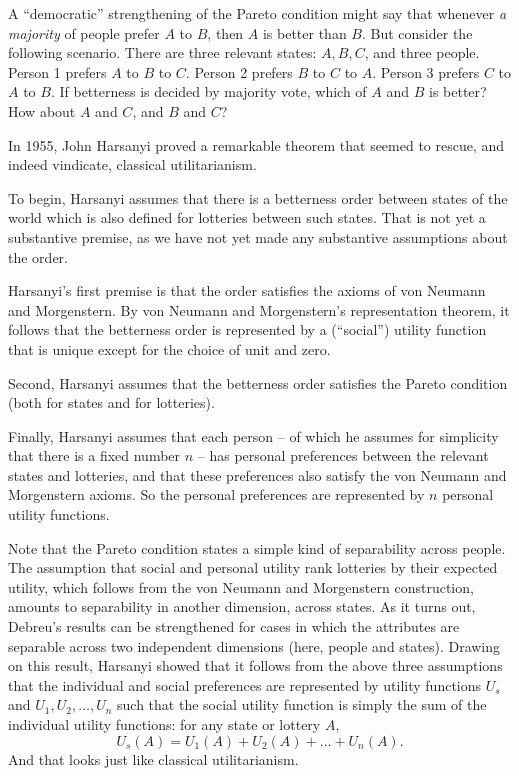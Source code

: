 \begin{exercise1}
  A ``democratic'' strengthening of the Pareto condition might say that whenever
  \emph{a majority} of people prefer $A$ to $B$, then $A$ is better than $B$.
  But consider the following scenario. There are three relevant states: $A,B,C$,
  and three people. Person 1 prefers $A$ to $B$ to $C$. Person 2 prefers $B$ to
  $C$ to $A$. Person 3 prefers $C$ to $A$ to $B$. If betterness is decided by
  majority vote, which of $A$ and $B$ is better? How about $A$ and $C$, and $B$
  and $C$?
\end{exercise1}

In 1955, John Harsanyi proved a remarkable theorem that seemed to
rescue, and indeed vindicate, classical utilitarianism. 

To begin, Harsanyi assumes that there is a betterness order
between states of the world which is also defined for lotteries between
such states. That is not yet a substantive premise, as we have not yet
made any substantive assumptions about the order. 

Harsanyi's first premise is that the order satisfies the axioms of von
Neumann and Morgenstern. By von Neumann and Morgenstern's
representation theorem, it follows that the betterness order is
represented by a (``social'') utility function that is unique except
for the choice of unit and zero.

Second, Harsanyi assumes that the betterness order satisfies the
Pareto condition (both for states and for lotteries).

Finally, Harsanyi assumes that each person -- of which he assumes for simplicity
that there is a fixed number $n$ -- has personal preferences between the
relevant states and lotteries, and that these preferences also satisfy the von
Neumann and Morgenstern axioms. So the personal preferences  are represented
by $n$ personal utility functions.

Note that the Pareto condition states a simple kind of separability
across people. The assumption that social and personal utility rank
lotteries by their expected utility, which follows from the von
Neumann and Morgenstern construction, amounts to separability in
another dimension, across states. As it turns out, Debreu's results
can be strengthened for cases in which the attributes are separable
across two independent dimensions (here, people and states). Drawing
on this result, Harsanyi showed that it follows from the above three
assumptions that the individual and social preferences are represented
by utility functions $U_s$ and $U_1,U_2,\ldots,U_n$ such that the
social utility function is simply the sum of the individual utility
functions: for any state or lottery $A$,
\[
  U_s(A) = U_1(A) + U_2(A) + \ldots + U_n(A).
\]
And that looks just like classical utilitarianism.

